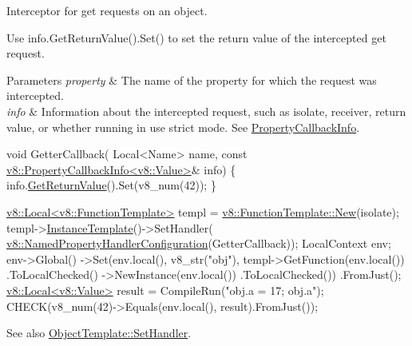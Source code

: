 Interceptor for get requests on an object.

Use {\ttfamily info.\+Get\+Return\+Value().Set()} to set the return value of the intercepted get request.


\begin{DoxyParams}{Parameters}
{\em property} & The name of the property for which the request was intercepted. \\
\hline
{\em info} & Information about the intercepted request, such as isolate, receiver, return value, or whether running in {\ttfamily \textquotesingle{}use strict}\textquotesingle{} mode. See {\ttfamily \mbox{\hyperlink{classv8_1_1PropertyCallbackInfo}{Property\+Callback\+Info}}}.\\
\hline
\end{DoxyParams}

\begin{DoxyCode}
\textcolor{keywordtype}{void} GetterCallback(
  Local<Name> name,
  \textcolor{keyword}{const} \mbox{\hyperlink{classv8_1_1PropertyCallbackInfo}{v8::PropertyCallbackInfo<v8::Value>}}& info) \{
    info.\mbox{\hyperlink{classv8_1_1PropertyCallbackInfo_aa0882946929c3c4df6d131fe0d8d6746}{GetReturnValue}}().Set(v8\_num(42));
\}

\mbox{\hyperlink{classv8_1_1Local}{v8::Local<v8::FunctionTemplate>}} templ =
    \mbox{\hyperlink{classv8_1_1FunctionTemplate_a0724f26034d01ce76bd106b193ab7e7a}{v8::FunctionTemplate::New}}(isolate);
templ->\mbox{\hyperlink{classv8_1_1FunctionTemplate_a00dd9725566908e8fd14064542f5a781}{InstanceTemplate}}()->SetHandler(
    \mbox{\hyperlink{structv8_1_1NamedPropertyHandlerConfiguration}{v8::NamedPropertyHandlerConfiguration}}(GetterCallback));
LocalContext env;
env->Global()
    ->Set(env.local(), v8\_str(\textcolor{stringliteral}{"obj"}), templ->GetFunction(env.local())
                                           .ToLocalChecked()
                                           ->NewInstance(env.local())
                                           .ToLocalChecked())
    .FromJust();
\mbox{\hyperlink{classv8_1_1Local}{v8::Local<v8::Value>}} result = CompileRun(\textcolor{stringliteral}{"obj.a = 17; obj.a"});
CHECK(v8\_num(42)->Equals(env.local(), result).FromJust());
\end{DoxyCode}


See also {\ttfamily \mbox{\hyperlink{classv8_1_1ObjectTemplate_a3d5666f1e9b0f46df6b4dbb7cfbb6114}{Object\+Template\+::\+Set\+Handler}}}. \mbox{\label{namespacev8_add9f7ab11e4a9a2b9ad2c4536b0e1a64}} 
